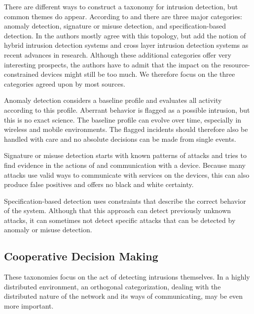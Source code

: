\documentclass[conference]{IEEEtran}
\begin{document}
There are different ways to construct a taxonomy for intrusion detection, but
common themes do appear. According to \cite{mishra2004intrusion} and
\cite{ioannis2007towards} there are three major categories: anomaly detection,
signature or misuse detection, and specification-based detection. In
\cite{alrajeh2013intrusion} the authors mostly agree with this topology, but
add the notion of hybrid intrusion detection systems and cross layer intrusion
detection systems as recent advances in research. Although these additional
categories offer very interesting prospects, the authors have to admit that the
impact on the resource-constrained devices might still be too much. We
therefore focus on the three categories agreed upon by most sources.

\begin{LaTeXdescription}
  
  \item[Anomaly detection] considers a baseline profile and evaluates all
  activity according to this profile. Aberrant behavior is flagged as a
  possible intrusion, but this is no exact science. The baseline profile can
  evolve over time, especially in wireless and mobile environments. The flagged
  incidents should therefore also be handled with care and no absolute
  decisions can be made from single events.
  
  \item[Signature or misuse detection] starts with known patterns of attacks
  and tries to find evidence in the actions of and communication with a device.
  Because many attacks use valid ways to communicate with services on the
  devices, this can also produce false positives and offers no black and white
  certainty.
  
  \item[Specification-based detection] uses constraints that describe the
  correct behavior of the system. Although that this approach can detect
  previously unknown attacks, it can sometimes not detect specific attacks that
  can be detected by anomaly or misuse detection.
  
\end{LaTeXdescription}

\subsection{Cooperative Decision Making}
\label{coorperative}

These taxonomies focus on the act of detecting intrusions themselves. In a
highly distributed environment, an orthogonal categorization, dealing with the
distributed nature of the network and its ways of communicating, may be even
more important.
\end{document}
